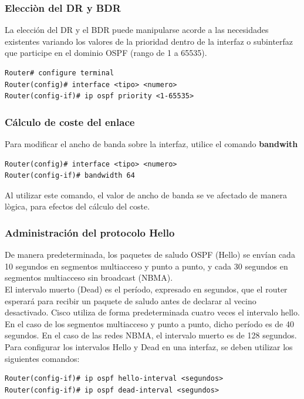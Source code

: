\documentclass[12pt]{article}
\begin{document}
\subsubsection{Elecciòn del DR y BDR}
La elección del DR y el BDR puede manipularse acorde a las necesidades existentes variando los valores de la prioridad dentro de la interfaz o subinterfaz que participe en el dominio OSPF (rango de 1 a 65535).
\begin{lstlisting}
Router# configure terminal
Router(config)# interface <tipo> <numero>
Router(config-if)# ip ospf priority <1-65535>
\end{lstlisting}

\subsubsection{Cálculo de coste del enlace}
Para modificar el ancho de banda sobre la interfaz, utilice el comando \textbf{bandwith}
\begin{lstlisting}
Router(config)# interface <tipo> <numero>
Router(config-if)# bandwidth 64
\end{lstlisting}

Al utilizar este comando, el valor de ancho de banda se ve afectado de manera lògica, para efectos del cálculo del coste.

\subsubsection{Administración del protocolo Hello}
De manera predeterminada, los paquetes de saludo OSPF (Hello) se envían cada 10 segundos en segmentos multiacceso y punto a punto, y cada 30 segundos en segmentos multiacceso sin broadcast (NBMA).\\

El intervalo muerto (Dead) es el período, expresado en segundos, que el router esperará para recibir un paquete de saludo antes de declarar al vecino desactivado. Cisco utiliza de forma predeterminada cuatro veces el intervalo hello. En el caso de los segmentos multiacceso y punto a punto, dicho período es de 40 segundos. En el caso de las redes NBMA, el intervalo muerto es de 128 segundos.\\

Para configurar los intervalos Hello y Dead en una interfaz, se deben utilizar los siguientes comandos:
\begin{lstlisting}
Router(config-if)# ip ospf hello-interval <segundos>
Router(config-if)# ip ospf dead-interval <segundos>
\end{lstlisting}
\end{document}
